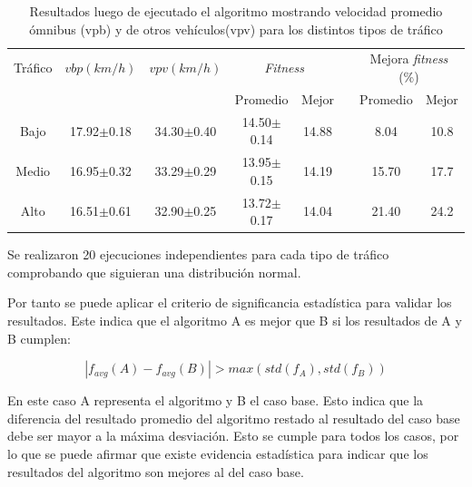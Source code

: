 \begin{table}[H]
	\renewcommand{\arraystretch}{1.2}	
		\centering
	\caption{Resultados luego de ejecutado el algoritmo mostrando velocidad promedio ómnibus (vpb) y  de otros vehículos(vpv) para los distintos tipos de tráfico }
	\label{table:resultado_caso_algoritmo}
	\begin{tabular}{cccccccc}
		\hline 
		Tráfico& 
		$vbp(km/h)$& 
		$vpv(km/h)$&
		\multicolumn{2}{c}{\emph{Fitness}}&  & 
		\multicolumn{2}{c}{Mejora \emph{fitness} (\%)}\\  \cline{4-5} \cline{7-8}&     &     & \multicolumn{1}{c}{Promedio} & \multicolumn{1}{c}{Mejor} &  & \multicolumn{1}{c}{Promedio} & \multicolumn{1}{c}{Mejor} \\ \hline
		Bajo & 17.92$\pm$0.18 & 34.30$\pm$0.40 & 14.50$\pm$0.14 & 14.88 & & 8.04 & 10.8  \\
		Medio& 16.95$\pm$0.32 & 33.29$\pm$0.29 & 13.95$\pm$0.15 & 14.19 & & 15.70& 17.7\\ 
		Alto & 16.51$\pm$0.61  & 32.90$\pm$0.25& 13.72$\pm$0.17 & 14.04 & & 21.40& 24.2\\	
		\hline	    
	\end{tabular}
\end{table}

Se realizaron 20 ejecuciones independientes para cada tipo de tráfico comprobando que siguieran una distribución normal.

Por tanto se puede aplicar el criterio de significancia estadística para validar los resultados. Este indica que el
algoritmo A es mejor que B si los resultados de A y B cumplen:

\begin{equation}
\label{eq:funcion_significancia}
\left |f_{avg}(A) - f_{avg}(B)  \right | > max(std(f_A),std(f_B))
\end{equation}

En este caso A representa el algoritmo y B el caso base. Esto indica que la diferencia del resultado promedio del algoritmo restado al resultado del caso base debe ser mayor a la máxima desviación.
Esto se cumple para todos los casos, por lo que se puede afirmar  que existe evidencia estadística para indicar que los resultados del algoritmo son mejores al del caso base.

